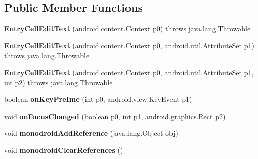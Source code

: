 \subsection*{Public Member Functions}
\begin{DoxyCompactItemize}
\item 
\mbox{\label{classmd5b60ffeb829f638581ab2bb9b1a7f4f3f_1_1EntryCellEditText_a1f812c4dd4a8466916a56cd524846c26}} 
{\bfseries Entry\+Cell\+Edit\+Text} (android.\+content.\+Context p0)  throws java.\+lang.\+Throwable 	
\item 
\mbox{\label{classmd5b60ffeb829f638581ab2bb9b1a7f4f3f_1_1EntryCellEditText_a1534671bdcadb40b84028d5077f27748}} 
{\bfseries Entry\+Cell\+Edit\+Text} (android.\+content.\+Context p0, android.\+util.\+Attribute\+Set p1)  throws java.\+lang.\+Throwable 	
\item 
\mbox{\label{classmd5b60ffeb829f638581ab2bb9b1a7f4f3f_1_1EntryCellEditText_ad9ec4d4eb1721ae9dacee80558ac74bb}} 
{\bfseries Entry\+Cell\+Edit\+Text} (android.\+content.\+Context p0, android.\+util.\+Attribute\+Set p1, int p2)  throws java.\+lang.\+Throwable 	
\item 
\mbox{\label{classmd5b60ffeb829f638581ab2bb9b1a7f4f3f_1_1EntryCellEditText_ae1f0f5abfb6ec318b45c3b0e65655095}} 
boolean {\bfseries on\+Key\+Pre\+Ime} (int p0, android.\+view.\+Key\+Event p1)
\item 
\mbox{\label{classmd5b60ffeb829f638581ab2bb9b1a7f4f3f_1_1EntryCellEditText_ae96ee8d425aa2330f0e03f3e2e42aa1e}} 
void {\bfseries on\+Focus\+Changed} (boolean p0, int p1, android.\+graphics.\+Rect p2)
\item 
\mbox{\label{classmd5b60ffeb829f638581ab2bb9b1a7f4f3f_1_1EntryCellEditText_ac2b60c2aace620dcf6c35e776cc89db4}} 
void {\bfseries monodroid\+Add\+Reference} (java.\+lang.\+Object obj)
\item 
\mbox{\label{classmd5b60ffeb829f638581ab2bb9b1a7f4f3f_1_1EntryCellEditText_a3a4945fa7f86ca938cd71b78f446aa32}} 
void {\bfseries monodroid\+Clear\+References} ()
\end{DoxyCompactItemize}
